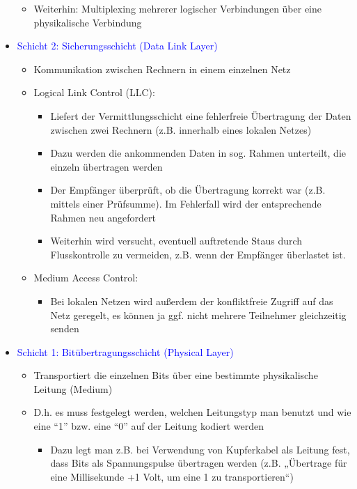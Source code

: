 \begin{itemize}
\begin{itemize}
        \item Weiterhin: Multiplexing mehrerer logischer Verbindungen über eine physikalische Verbindung
    \end{itemize}
    \item \textcolor{blue}{Schicht 2: Sicherungsschicht (Data Link Layer)}
    \begin{itemize}
        \item Kommunikation zwischen Rechnern in einem einzelnen Netz
        \item Logical Link Control (LLC):
        \begin{itemize}
            \item Liefert der Vermittlungsschicht eine fehlerfreie Übertragung der Daten zwischen zwei Rechnern (z.B. innerhalb eines lokalen Netzes)
            \item Dazu werden die ankommenden Daten in sog. Rahmen unterteilt, die einzeln übertragen werden
            \item Der Empfänger überprüft, ob die Übertragung korrekt war (z.B. mittels einer Prüfsumme). Im Fehlerfall wird der entsprechende Rahmen neu angefordert
            \item Weiterhin wird versucht, eventuell auftretende Staus durch Flusskontrolle zu vermeiden, z.B. wenn der Empfänger überlastet ist.
        \end{itemize}
        \item Medium Access Control:
        \begin{itemize}
            \item Bei lokalen Netzen wird außerdem der konfliktfreie Zugriff auf das Netz geregelt, es können ja ggf. nicht mehrere Teilnehmer gleichzeitig senden
        \end{itemize}
    \end{itemize}
    \item \textcolor{blue}{Schicht 1: Bitübertragungsschicht (Physical Layer)}
    \begin{itemize}
        \item Transportiert die einzelnen Bits über eine bestimmte physikalische Leitung (Medium)
        \item D.h. es muss festgelegt werden, welchen Leitungstyp man benutzt und wie eine “1” bzw. eine “0” auf der Leitung kodiert werden
        \begin{itemize}
            \item Dazu legt man z.B. bei Verwendung von Kupferkabel als Leitung fest, dass Bits als Spannungspulse übertragen werden (z.B. „Übertrage für eine Millisekunde +1 Volt, um eine 1 zu transportieren“)

\end{itemize}
\end{itemize}
\end{itemize}
